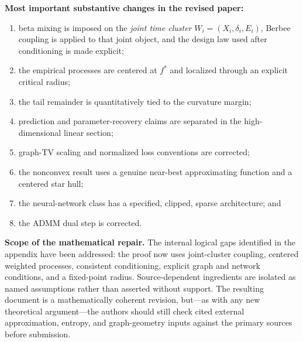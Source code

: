 \documentclass[11pt]{article}
\begin{document}
\begin{center}
\end{center}
\textbf{Most important substantive changes in the revised paper:}
\begin{enumerate}[leftmargin=2em]
\item beta mixing is imposed on the \emph{joint time cluster} $W_i=(X_i,\delta_i,E_i)$, Berbee coupling is applied to that joint object, and the design law used after conditioning is made explicit;
\item the empirical processes are centered at $f^*$ and localized through an explicit critical radius;
\item the tail remainder is quantitatively tied to the curvature margin;
\item prediction and parameter-recovery claims are separated in the high-dimensional linear section;
\item graph-TV scaling and normalized loss conventions are corrected;
\item the nonconvex result uses a genuine near-best approximating function and a centered star hull;
\item the neural-network class has a specified, clipped, sparse architecture; and
\item the ADMM dual step is corrected.
\end{enumerate}

\textbf{Scope of the mathematical repair.} The internal logical gaps identified in the appendix have been addressed: the proof now uses joint-cluster coupling, centered weighted processes, consistent conditioning, explicit graph and network conditions, and a fixed-point radius. Source-dependent ingredients are isolated as named assumptions rather than asserted without support. The resulting document is a mathematically coherent revision, but---as with any new theoretical argument---the authors should still check cited external approximation, entropy, and graph-geometry inputs against the primary sources before submission.
\end{document}
